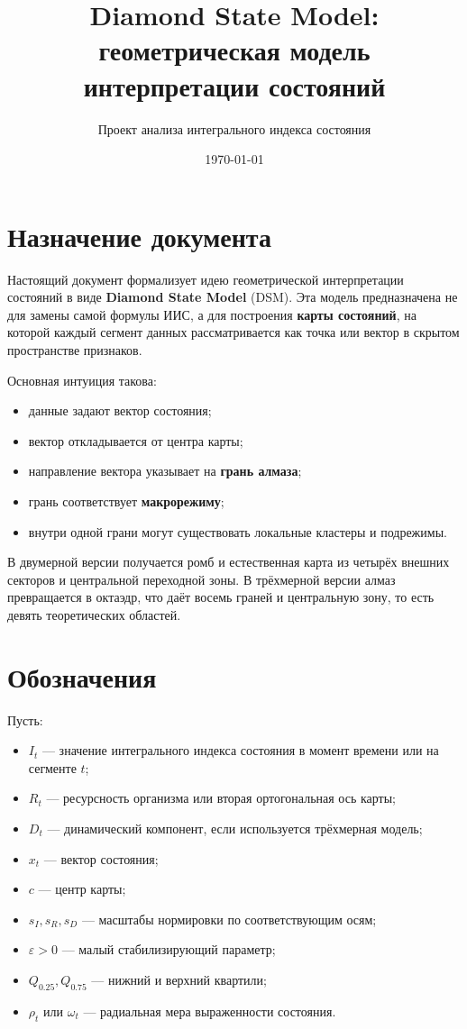 \documentclass[12pt,a4paper]{article}
\title{Diamond State Model: геометрическая модель интерпретации состояний}
\author{Проект анализа интегрального индекса состояния}
\date{\today}
\begin{document}
\maketitle

\section{Назначение документа}
Настоящий документ формализует идею геометрической интерпретации состояний в виде \textbf{Diamond State Model} (DSM). Эта модель предназначена не для замены самой формулы ИИС, а для построения \textbf{карты состояний}, на которой каждый сегмент данных рассматривается как точка или вектор в скрытом пространстве признаков.

Основная интуиция такова:
\begin{itemize}[leftmargin=1.25cm]
    \item данные задают вектор состояния;
    \item вектор откладывается от центра карты;
    \item направление вектора указывает на \textbf{грань алмаза};
    \item грань соответствует \textbf{макрорежиму};
    \item внутри одной грани могут существовать локальные кластеры и подрежимы.
\end{itemize}

В двумерной версии получается ромб и естественная карта из четырёх внешних секторов и центральной переходной зоны. В трёхмерной версии алмаз превращается в октаэдр, что даёт восемь граней и центральную зону, то есть девять теоретических областей.

\section{Обозначения}
Пусть:
\begin{itemize}[leftmargin=1.25cm]
    \item $I_t$ --- значение интегрального индекса состояния в момент времени или на сегменте $t$;
    \item $R_t$ --- ресурсность организма или вторая ортогональная ось карты;
    \item $D_t$ --- динамический компонент, если используется трёхмерная модель;
    \item $x_t$ --- вектор состояния;
    \item $c$ --- центр карты;
    \item $s_I, s_R, s_D$ --- масштабы нормировки по соответствующим осям;
    \item $\varepsilon > 0$ --- малый стабилизирующий параметр;
    \item $Q_{0.25}, Q_{0.75}$ --- нижний и верхний квартили;
    \item $\rho_t$ или $\omega_t$ --- радиальная мера выраженности состояния.
\end{itemize}
\end{document}
